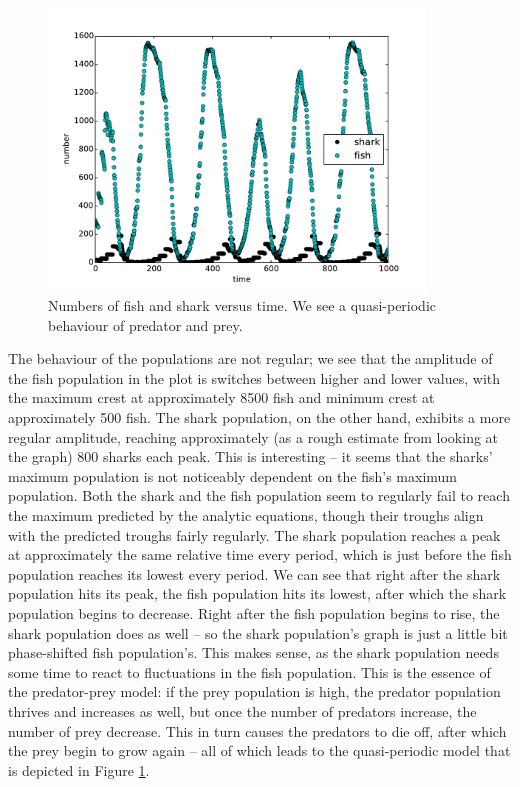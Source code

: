 \documentclass{article}
\begin{document}
\begin{figure}[H]
\centering
\captionsetup{justification=centering, margin=3 cm}
\includegraphics[width=10cm]{population.pdf}
\caption{Numbers of fish and shark versus time. We see a quasi-periodic behaviour of predator and prey.}
\label{fig:graph}
\end{figure}
The behaviour of the populations are not regular; we see that the amplitude of the fish population in the plot is switches between higher and lower values, with the maximum crest at approximately 8500 fish and minimum crest at approximately 500 fish. The shark population, on the other hand, exhibits a more regular amplitude, reaching approximately (as a rough estimate from looking at the graph) 800 sharks each peak. This is interesting -- it seems that the sharks' maximum population is not noticeably dependent on the fish's maximum population. Both the shark and the fish population seem to regularly fail to reach the maximum predicted by the analytic equations, though their troughs align with the predicted troughs fairly regularly. The shark population reaches a peak at approximately the same relative time every period, which is just before the fish population reaches its lowest every period. We can see that right after the shark population hits its peak, the fish population hits its lowest, after which the shark population begins to decrease. Right after the fish population begins to rise, the shark population does as well -- so the shark population's graph is just a little bit phase-shifted fish population's. This makes sense, as the shark population needs some time to react to fluctuations in the fish population. This is the essence of the predator-prey model: if the prey population is high, the predator population thrives and increases as well, but once the number of predators increase, the number of prey decrease. This in turn causes the predators to die off, after which the prey begin to grow again -- all of which leads to the quasi-periodic model that is depicted in Figure \ref{fig:graph}.\par 
\end{document}
